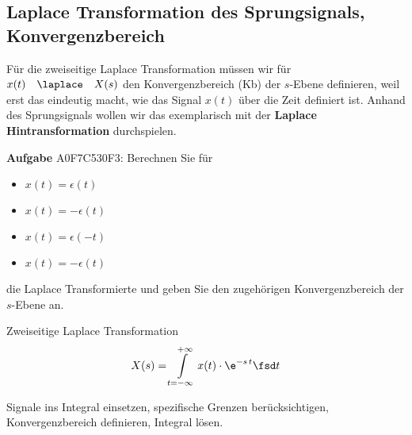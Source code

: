 \newpage
\subsection{Laplace Transformation des Sprungsignals, Konvergenzbereich}
\label{sec:A0F7C530F3}
\begin{Ziel}
Für die zweiseitige Laplace Transformation müssen wir für
$x(t) \quad \laplace \quad X(s)$
den Konvergenzbereich (Kb) der $s$-Ebene definieren, weil erst das eindeutig
macht, wie das Signal $x(t)$ über die Zeit definiert ist.
Anhand des Sprungsignals wollen wir das exemplarisch mit der
\textbf{Laplace Hintransformation} durchspielen.
\end{Ziel}
\textbf{Aufgabe} {\tiny A0F7C530F3}: Berechnen Sie für
\begin{itemize}
  \item $x(t)=\epsilon(t)$
  \item $x(t)=-\epsilon(t)$
  \item $x(t)=\epsilon(-t)$
  \item $x(t)=-\epsilon(t)$
\end{itemize}
die Laplace Transformierte und geben Sie den zugehörigen Konvergenzbereich
der $s$-Ebene an.
\begin{Werkzeug}
Zweiseitige Laplace Transformation
\begin{align}
X(s) = \int\limits_{t=-\infty}^{+\infty} x(t) \cdot \e^{-s\,t} \fsd t
\end{align}
\end{Werkzeug}
\begin{Ansatz}
Signale ins Integral einsetzen, spezifische Grenzen berücksichtigen,
Konvergenzbereich definieren, Integral lösen.
\end{Ansatz}
